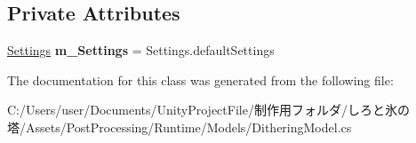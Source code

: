 \subsection*{Private Attributes}
\begin{DoxyCompactItemize}
\item 
\mbox{\label{class_unity_engine_1_1_post_processing_1_1_dithering_model_ae1e2300639e2cd2bb36a2db157b98940}} 
\hyperlink{struct_unity_engine_1_1_post_processing_1_1_dithering_model_1_1_settings}{Settings} {\bfseries m\+\_\+\+Settings} = Settings.\+default\+Settings
\end{DoxyCompactItemize}


The documentation for this class was generated from the following file\+:\begin{DoxyCompactItemize}
\item 
C\+:/\+Users/user/\+Documents/\+Unity\+Project\+File/制作用フォルダ/しろと氷の塔/\+Assets/\+Post\+Processing/\+Runtime/\+Models/Dithering\+Model.\+cs\end{DoxyCompactItemize}
